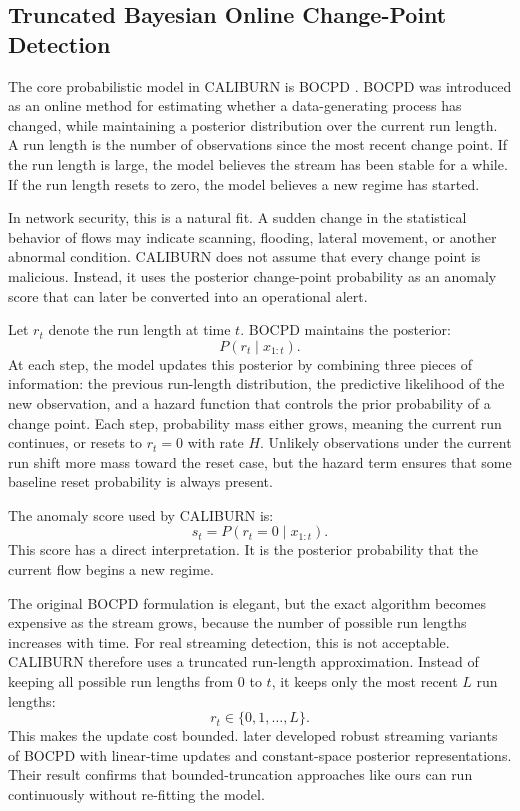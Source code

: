 \documentclass[preprint,12pt,authoryear]{elsarticle}
\newcommand{\caliburn}{CALIBURN}
\begin{document}
\subsection{Truncated Bayesian Online Change-Point Detection}
\label{sec:method-bocpd}

The core probabilistic model in \caliburn{} is BOCPD \citep{adams2007bayesian}. BOCPD was introduced as an online method for estimating whether a data-generating process has changed, while maintaining a posterior distribution over the current run length. A run length is the number of observations since the most recent change point. If the run length is large, the model believes the stream has been stable for a while. If the run length resets to zero, the model believes a new regime has started.

In network security, this is a natural fit. A sudden change in the statistical behavior of flows may indicate scanning, flooding, lateral movement, or another abnormal condition. \caliburn{} does not assume that every change point is malicious. Instead, it uses the posterior change-point probability as an anomaly score that can later be converted into an operational alert.

Let $r_t$ denote the run length at time $t$. BOCPD maintains the posterior:
\begin{equation}
    P(r_t \mid x_{1:t}).
\end{equation}
At each step, the model updates this posterior by combining three pieces of information: the previous run-length distribution, the predictive likelihood of the new observation, and a hazard function that controls the prior probability of a change point. Each step, probability mass either grows, meaning the current run continues, or resets to $r_t = 0$ with rate $H$. Unlikely observations under the current run shift more mass toward the reset case, but the hazard term ensures that some baseline reset probability is always present.

The anomaly score used by \caliburn{} is:
\begin{equation}
    s_t = P(r_t = 0 \mid x_{1:t}).
    \label{eq:anomaly-score}
\end{equation}
This score has a direct interpretation. It is the posterior probability that the current flow begins a new regime.

The original BOCPD formulation is elegant, but the exact algorithm becomes expensive as the stream grows, because the number of possible run lengths increases with time. For real streaming detection, this is not acceptable. \caliburn{} therefore uses a truncated run-length approximation. Instead of keeping all possible run lengths from $0$ to $t$, it keeps only the most recent $L$ run lengths:
\begin{equation}
    r_t \in \{0, 1, \ldots, L\}.
\end{equation}
This makes the update cost bounded. \citet{knoblauch2018doubly} later developed robust streaming variants of BOCPD with linear-time updates and constant-space posterior representations. Their result confirms that bounded-truncation approaches like ours can run continuously without re-fitting the model.
\end{document}
